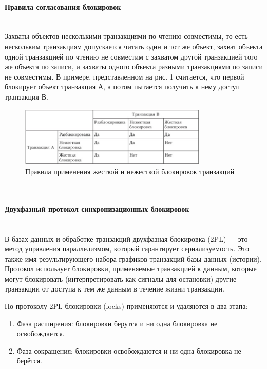 \paragraph{Правила согласования блокировок} ~\\

Захваты объектов несколькими транзакциями по чтению совместимы, то есть нескольким транзакциям допускается читать один и тот же объект, захват объекта одной транзакцией по чтению не совместим с захватом другой транзакцией того же объекта по записи, и захваты одного объекта разными транзакциями по записи не совместимы. В примере, представленном на рис. 1 считается, что первой блокирует объект транзакция А, а потом пытается получить к нему доступ транзакция В.

\begin{figure}[h!]
    \centering
    \includegraphics[width=0.8\textwidth]{assets/blocks.PNG}
    \caption{Правила применения жесткой и нежесткой блокировок транзакций}
\end{figure}
\\

\paragraph{Двухфазный протокол синхронизационных блокировок} ~\\

В базах данных и обработке транзакций двухфазная блокировка (2PL) — это метод управления параллелизмом, который гарантирует сериализуемость. Это также имя результирующего набора графиков транзакций базы данных (истории). Протокол использует блокировки, применяемые транзакцией к данным, которые могут блокировать (интерпретировать как сигналы для остановки) другие транзакции от доступа к тем же данным в течение жизни транзакции.

По протоколу 2PL блокировки (locks) применяются и удаляются в два этапа:
\begin{enumerate}
\item Фаза расширения: блокировки берутся и ни одна блокировка не освобождается.
\item Фаза сокращения: блокировки освобождаются и ни одна блокировка не берётся.
\end{enumerate}

